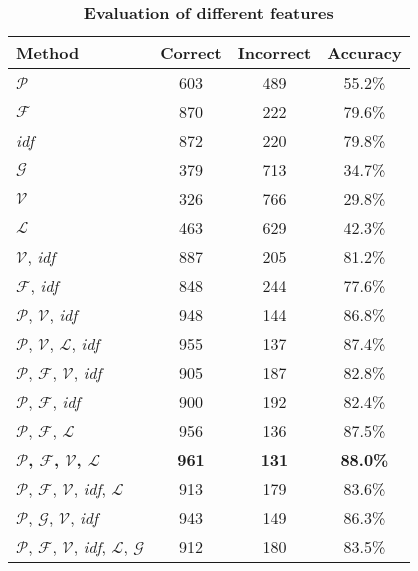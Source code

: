 \documentclass[11pt,english]{article}
\begin{document}
\begin{multicols}{2}
\begin{table*}[!htb]
\centering%
\caption{\small \textbf{\textsf{Evaluation of different features}}}%
\begin{tabular}{l c c c}
\hline\hline
Method & Correct & Incorrect & Accuracy \\
[0.5ex]
\hline
$\mathcal{P}$ & 603 & 489 & 55.2\% \\
$\mathcal{F}$ & 870 & 222 & 79.6\% \\
\emph{idf} & 872 & 220 & 79.8\% \\
$\mathcal{G}$ & 379 & 713 & 34.7\% \\
$\mathcal{V}$ & 326 & 766 & 29.8\% \\
$\mathcal{L}$ & 463 & 629 & 42.3\% \\
$\mathcal{V}$, \emph{idf} & 887 & 205 & 81.2\% \\
$\mathcal{F}$, \emph{idf} & 848 & 244 & 77.6\% \\
$\mathcal{P}$, $\mathcal{V}$, \emph{idf} & 948 & 144 & 86.8\% \\
$\mathcal{P}$, $\mathcal{V}$, $\mathcal{L}$, \emph{idf} & 955 & 137 & 87.4\% \\
$\mathcal{P}$, $\mathcal{F}$, $\mathcal{V}$, \emph{idf} & 905 & 187 & 82.8\% \\
$\mathcal{P}$, $\mathcal{F}$, \emph{idf} & 900 & 192 & 82.4\% \\
$\mathcal{P}$, $\mathcal{F}$, $\mathcal{L}$ & 956 & 136 & 87.5\% \\
\textbf{$\mathcal{P}$, $\mathcal{F}$, $\mathcal{V}$, $\mathcal{L}$} & \textbf{961} & \textbf{131} & \textbf{88.0\%} \\
$\mathcal{P}$, $\mathcal{F}$, $\mathcal{V}$, \emph{idf}, $\mathcal{L}$ & 913 & 179 & 83.6\% \\
$\mathcal{P}$, $\mathcal{G}$, $\mathcal{V}$, \emph{idf} & 943 & 149 & 86.3\% \\
$\mathcal{P}$, $\mathcal{F}$, $\mathcal{V}$, \emph{idf}, $\mathcal{L}$, $\mathcal{G}$ & 912 & 180 & 83.5\% \\ [1ex]
\hline
\end{tabular}
\label{tbl:eval}%
\end{table*}%


\end{multicols}
\end{document}
